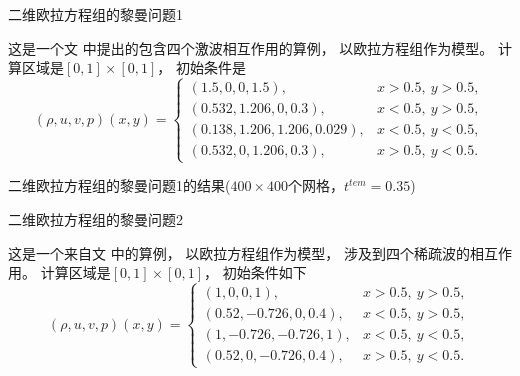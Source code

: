 \documentclass[aspectratio=169]{beamer}
\begin{document}

\begin{frame}{二维欧拉方程组的黎曼问题1}
  
  \begin{example}[二维欧拉方程组的黎曼问题1]
    \label{ex:RP1}
    这是一个文 \citep{RPexample} 中提出的包含四个激波相互作用的算例，
    以欧拉方程组作为模型。
    计算区域是$[0,1]\times[0,1]$，
    初始条件是
    \begin{equation*}
      (\rho, u, v, p) (x, y)=
      \begin{cases}
        (1.5, 0, 0, 1.5),             & x>0.5,~y>0.5,  \\
        (0.532, 1.206, 0, 0.3),       & x<0.5,~y>0.5,  \\
        (0.138, 1.206, 1.206, 0.029), & x<0.5,~y<0.5,  \\
        (0.532, 0, 1.206, 0.3),       & x>0.5,~y<0.5.
      \end{cases}
    \end{equation*}
  \end{example}
  
\end{frame}

\begin{frame}{二维欧拉方程组的黎曼问题1的结果($400 \times 400$个网格，$t^{tem}=0.35$)}
  
  \begin{figure}[htbp]
    \centering
    \hspace{0.05\textwidth}
  \end{figure}
  
\end{frame}

\begin{frame}{二维欧拉方程组的黎曼问题2}
  
  \begin{example}[二维欧拉方程组的黎曼问题2]
    \label{ex:RP2}
    这是一个来自文 \citep{RPexample} 中的算例，
    以欧拉方程组作为模型，
    涉及到四个稀疏波的相互作用。
    计算区域是$[0,1]\times[0,1]$，
    初始条件如下
    \begin{equation*}
      (\rho, u, v, p) (x, y)=
      \begin{cases}
        (1, 0, 0, 1),           & x>0.5,~y>0.5,  \\
        (0.52, -0.726, 0, 0.4), & x<0.5,~y>0.5,  \\
        (1, -0.726, -0.726, 1), & x<0.5,~y<0.5,  \\
        (0.52, 0, -0.726, 0.4), & x>0.5,~y<0.5.
      \end{cases}
    \end{equation*}
  \end{example}
  
\end{frame}
\end{document}
